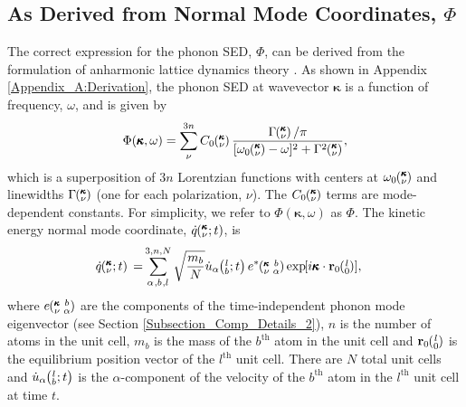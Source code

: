 \subsection{\label{S:Subsection_NMD}As Derived from Normal Mode 
Coordinates, $\Phi$}
The correct expression for the phonon SED, $\Phi$, can be derived from 
the formulation of anharmonic 
lattice dynamics theory 
\cite{maradudin_dynamical_1974,wallace_thermodynamics_1972,
dove_introduction_1993,srivastava_physics_1990}. 
As shown in Appendix \ref{Appendix_A:Derivation}, 
the phonon SED at wavevector $\pmb{\kappa}$ 
is a function of frequency, $\omega$,
and is given by
\begin{equation}\label{E:Lorentzian_NMD}
\begin{split}
\Phi(\pmb{\kappa},\omega) = \sum_{\nu}^{3n}C_0\kv\frac{\Gamma\kv/\pi}
{[\omega_0\kv-\omega]^2+\Gamma^2\kv},
\end{split}
\end{equation}
which is a superposition of $3n$ Lorentzian functions with centers at 
$\omega_0\mspace{-4.0mu}\left(\mspace{-8.0mu} \begin{smallmatrix}&\pmb{\kappa} \\&\nu\end{smallmatrix} \mspace{-3.0mu}\right)$ 
and linewidths 
$\Gamma \mspace{-4.0mu}\left(\mspace{-8.0mu} \begin{smallmatrix}&\pmb{\kappa} \\&\nu\end{smallmatrix} \mspace{-3.0mu}\right)$ 
(one for each polarization, $\nu$). 
The $C_0 \mspace{-4.0mu}\left(\mspace{-8.0mu} \begin{smallmatrix}&\pmb{\kappa} \\&\nu\end{smallmatrix} \mspace{-3.0mu}\right)$ terms 
are mode-dependent constants. 
For simplicity, we refer to $\Phi(\pmb{\kappa},\omega)$ as $\Phi$. 
The kinetic energy normal mode coordinate, $\dot{q}\mspace{-4.0mu}\left(\mspace{-8.0mu} \begin{smallmatrix}&\pmb{\kappa} \\&\nu\end{smallmatrix} \mspace{-2.0mu};t\right)$, is 
\cite{dove_introduction_1993}
\begin{equation}\label{E:qdot_HLD}
\begin{split}
\dot{q}\kvt{}{}{}=&\SUM{0}{}\sqrt{\frac{m_b}{N}}\dot{u}_{\alpha}\lbt 
e^*\kvba\EXP{i\pmb{\kappa}\cdot\mathbf{r}_0\ab{l}{0}},
\end{split}
\end{equation}
where $e\mspace{-4.0mu}\left(\mspace{-8.0mu} \begin{smallmatrix} &\pmb{\kappa} &b \\ &\nu &\alpha\end{smallmatrix} \mspace{-3.0mu}\right)$ are the components of the time-independent phonon mode 
eigenvector (see Section \ref{Subsection_Comp_Details_2}), 
$n$ is the number of atoms in the unit cell, 
$m_b$ is the mass of the $b^{\textrm{th}}$ atom in the unit cell and 
$\mathbf{r}_0\ab{l}{0}$ is the equilibrium position vector of the 
$l^{\textrm{th}}$ unit cell. There are $N$ total unit cells and 
$\dot{u}_{\alpha}\mspace{-4.0mu}\left(\mspace{-8.0mu} \begin{smallmatrix}&l \\&b\end{smallmatrix}\mspace{-2.0mu};t\right)$ 
is the $\alpha$-component of the velocity of the
$b^{\textrm{th}}$ atom in the $l^{\textrm{th}}$ unit cell at time $t$.


